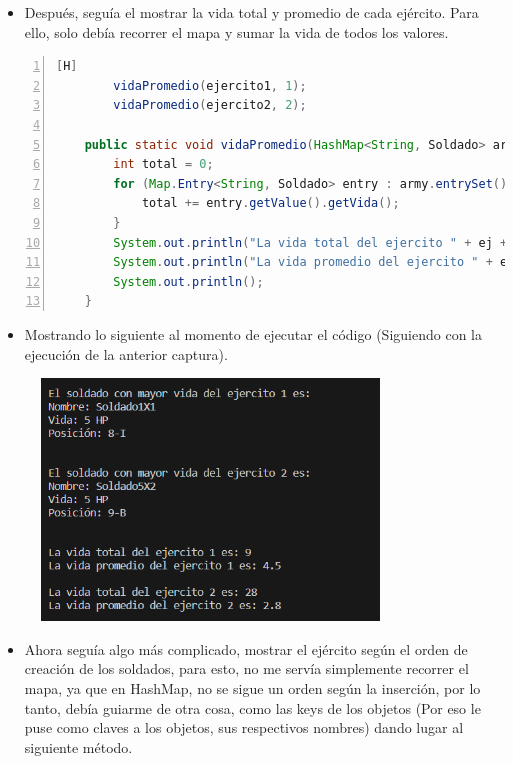 \documentclass{article}
\begin{document}
	\begin{itemize}	
		\item Después, seguía el mostrar la vida total y promedio de cada ejército. Para ello, solo debía recorrer el mapa y sumar la vida de todos los valores.
	\end{itemize}
	\begin{lstlisting}[language=java,caption={Vida promedio y total}, numbers=left][H]
		vidaPromedio(ejercito1, 1);
		vidaPromedio(ejercito2, 2);
	
	public static void vidaPromedio(HashMap<String, Soldado> army, int ej) {
        int total = 0;
        for (Map.Entry<String, Soldado> entry : army.entrySet()) {
            total += entry.getValue().getVida();
        }
        System.out.println("La vida total del ejercito " + ej + " es: " + total);
        System.out.println("La vida promedio del ejercito " + ej + " es: " + total / (1.0 * army.size()));
        System.out.println();
    }
	\end{lstlisting}
	\begin{itemize}	
		\item Mostrando lo siguiente al momento de ejecutar el código (Siguiendo con la ejecución de la anterior captura).
	\end{itemize}
	
	\begin{figure}[H]
		\centering
	\includegraphics[width=0.8\textwidth,keepaspectratio]{img/captura2.png}
	\end{figure}
	\begin{itemize}	
		\item Ahora seguía algo más complicado, mostrar el ejército según el orden de creación de los soldados, para esto, no me servía simplemente recorrer el mapa, ya que en HashMap, no se sigue un orden según la inserción, por lo tanto, debía guiarme de otra cosa, como las keys de los objetos (Por eso le puse como claves a los objetos, sus respectivos nombres) dando lugar al siguiente método.
	\end{itemize}
	
\end{document}
